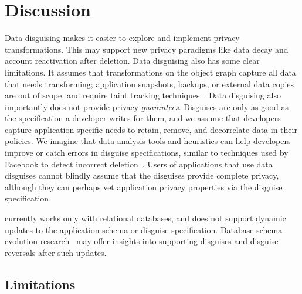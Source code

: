 \section{Discussion}
%
Data disguising makes it easier to explore and implement privacy transformations.
%
This may support new privacy paradigms like data decay and account reactivation after
deletion.
%
%
%
Data disguising also has some clear limitations.
%
It assumes that transformations on the object graph capture all data that needs transforming;
application snapshots, backups, or external data copies are out of scope, and require
\eg taint tracking techniques~\cite{schengendb}.
Data disguising also importantly does not provide privacy \emph{guarantees}.
%
Disguises are only as good as the specification a developer writes for them, and we assume
that developers capture application-specific needs to retain, remove, and decorrelate data in
their policies.
We imagine that data analysis tools and heuristics can help developers improve or catch
errors in disguise specifications, similar to techniques used by Facebook to detect incorrect
deletion~\cite{delf}.
%
Users of applications that use data disguises cannot blindly assume that the disguises provide
complete privacy, although they can perhaps vet application privacy properties via the disguise
specification.
%

\sys currently works only with relational databases, and does not support dynamic
updates to the application schema or disguise specification.
%
Database schema evolution research~\cite{schema:evo} may offer insights
into supporting disguises and disguise reversals after such updates.



\iffalse
\subsection{Limitations}

